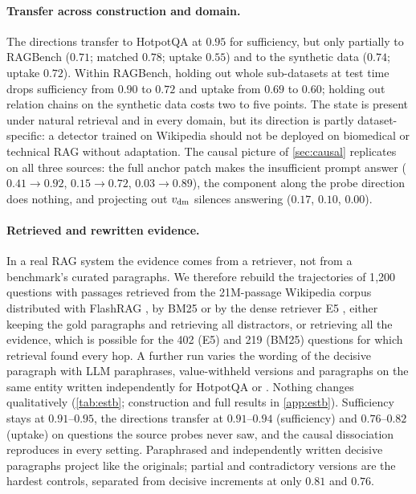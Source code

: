 \begin{table}[t]
\centering\scriptsize
\setlength{\tabcolsep}{2.5pt}

\caption{External benchmarks (Qwen2.5-7B). Within-dataset probes trained and tested on the row's dataset; \musique{} 2-hop directions applied without retraining; and the patching and projection-out tests of \cref{sec:causal} (answered rate, 150 held-out questions). ``Held-out sub-datasets'' and ``held-out relation chains'' test on groups never seen in training.}
\label{tab:external}
\end{table}

\paragraph{Transfer across construction and domain.}
The \musique{} directions transfer to HotpotQA at $0.95$ for sufficiency, but only partially to RAGBench ($0.71$; matched $0.78$; uptake $0.55$) and to the synthetic data ($0.74$; uptake $0.72$). Within RAGBench, holding out whole sub-datasets at test time drops sufficiency from $0.90$ to $0.72$ and uptake from $0.69$ to $0.60$; holding out relation chains on the synthetic data costs two to five points. The state is present under natural retrieval and in every domain, but its direction is partly dataset-specific: a detector trained on Wikipedia should not be deployed on biomedical or technical RAG without adaptation. The causal picture of \cref{sec:causal} replicates on all three sources: the full anchor patch makes the insufficient prompt answer ($0.41\to0.92$, $0.15\to0.72$, $0.03\to0.89$), the component along the probe direction does nothing, and projecting out $v_{\mathrm{dm}}$ silences answering ($0.17$, $0.10$, $0.00$).

\paragraph{Retrieved and rewritten evidence.}
In a real RAG system the evidence comes from a retriever, not from a benchmark's curated paragraphs. We therefore rebuild the trajectories of 1{,}200 \musique{} questions with passages retrieved from the 21M-passage Wikipedia corpus distributed with FlashRAG \cite{jin2025flashrag,karpukhin2020dense}, by BM25 \cite{robertson2009bm25} or by the dense retriever E5 \cite{wang2022e5}, either keeping the gold paragraphs and retrieving all distractors, or retrieving all the evidence, which is possible for the 402 (E5) and 219 (BM25) questions for which retrieval found every hop. A further run varies the wording of the decisive paragraph with LLM paraphrases, value-withheld versions and paragraphs on the same entity written independently for HotpotQA or \twowiki{}. Nothing changes qualitatively (\cref{tab:estb}; construction and full results in \cref{app:estb}). Sufficiency stays at $0.91$--$0.95$, the \musique{} directions transfer at $0.91$--$0.94$ (sufficiency) and $0.76$--$0.82$ (uptake) on questions the source probes never saw, and the causal dissociation reproduces in every setting. Paraphrased and independently written decisive paragraphs project like the originals; partial and contradictory versions are the hardest controls, separated from decisive increments at only $0.81$ and $0.76$.
